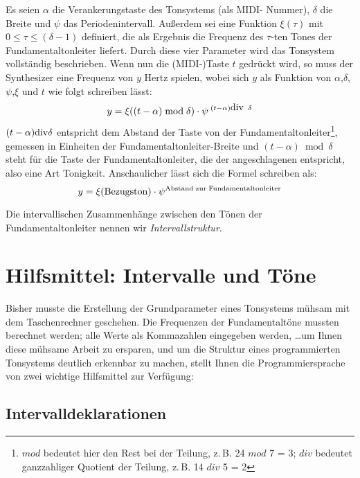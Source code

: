 Es seien $\alpha$ die Verankerungstaste des Tonsystems (als MIDI-
Nummer), $\delta$ die Breite und $\psi$ das Periodenintervall.
Außerdem sei eine Funktion $\xi ( \tau )$ mit $ 0 \le \tau \le (
\delta - 1 )$ definiert, die als Ergebnis die Frequenz des $\tau$-ten Tones der Fundamentaltonleiter liefert.
Durch diese vier Parameter wird das Tonsystem vollständig
beschrieben. Wenn nun die (MIDI-)Taste $t$ gedrückt wird, so muss der
Synthesizer eine Frequenz von $y$ Hertz spielen, wobei sich $y$ als
Funktion von $\alpha$,$\delta$,$\psi$,$\xi$ und $t$ wie folgt
schreiben lässt:
\[ y= \xi ((t-\alpha) \bmod \delta ) \cdot \psi ^ {\;(t-\alpha )
\mbox{\rm div}\;\; \delta } \]
$ (t-\alpha ) \/{\rm div}\/ \delta $ entspricht dem Abstand der Taste
von der Fundamentaltonleiter\footnote{$mod$ bedeutet hier den Rest bei der Teilung, z.\,B.
24 $mod$ 7 = 3; $div$ bedeutet ganzzahliger Quotient der 
Teilung, z.\,B. 14 $div$ 5 =
2}, gemessen in Einheiten der Fundamentaltonleiter-Breite und
$(t-\alpha) \bmod \delta $ steht für die Taste der Fundamentaltonleiter, die der
angeschlagenen entspricht, also eine Art Tonigkeit.
Anschaulicher lässt sich die Formel schreiben als:
\[ y= \xi ( {\rm Bezugston} ) \cdot \psi ^ {\/{\rm Abstand\;zur\;Fundamentaltonleiter}} \]

Die intervallischen Zusammenhänge zwischen den Tönen der
Fundamentaltonleiter nennen wir \emph{Intervallstruktur}.


\section{Hilfsmittel: Intervalle und Töne}\label{sec:hilfsm-interv-und}
Bisher musste die Erstellung der Grundparameter eines Tonsystems
müh\-sam mit dem Taschenrechner geschehen. Die Frequenzen der
Fundamentaltöne mussten berechnet werden; alle Werte als Kommazahlen
eingegeben werden, \ldots um Ihnen diese mühsame Arbeit zu ersparen,
und um die Struktur eines programmierten Tonsystems deutlich erkennbar
zu machen, stellt Ihnen die Programmiersprache von \mutabor{} zwei
wichtige Hilfsmittel zur Verfügung:

\subsection{Intervalldeklarationen}\label{sec:interv}

